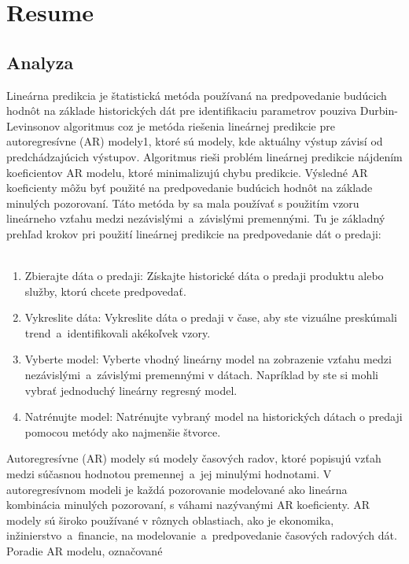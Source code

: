 \chapter{Resume} \label{resume}
    \section{Analyza} \label{sk:analytic}
    Lineárna predikcia je štatistická metóda používaná na predpovedanie budúcich hodnôt na základe historických dát pre
    identifikaciu parametrov pouziva Durbin-Levinsonov algoritmus coz je metóda riešenia lineárnej predikcie pre
    autoregresívne (AR) modely1, ktoré sú modely, kde aktuálny výstup závisí od predchádzajúcich výstupov. Algoritmus
    rieši problém lineárnej predikcie nájdením koeficientov AR modelu, ktoré minimalizujú chybu predikcie. Výsledné AR
    koeficienty môžu byť použité na predpovedanie budúcich hodnôt na základe minulých pozorovaní. Táto metóda by sa mala
    používať s použitím vzoru lineárneho vzťahu medzi nezávislými~a~závislými premennými. Tu je základný prehľad krokov
    pri použití lineárnej predikcie na predpovedanie dát o predaji:\\
    \\
    \begin{enumerate}
        \item Zbierajte dáta o predaji: Získajte historické dáta o predaji produktu alebo služby, ktorú chcete predpovedať.
        \item Vykreslite dáta: Vykreslite dáta o predaji v čase, aby ste vizuálne preskúmali trend~a~identifikovali
        akékoľvek vzory.
        \item Vyberte model: Vyberte vhodný lineárny model na zobrazenie vzťahu medzi nezávislými~a~závislými
        premennými v dátach. Napríklad by ste si mohli vybrať jednoduchý lineárny regresný model.
        \item Natrénujte model: Natrénujte vybraný model na historických dátach o predaji pomocou metódy ako najmenšie štvorce.
    \end{enumerate}
    Autoregresívne (AR) modely sú modely časových radov, ktoré popisujú vzťah medzi súčasnou hodnotou premennej~a~jej
    minulými hodnotami. V autoregresívnom modeli je každá pozorovanie modelované ako lineárna kombinácia minulých
    pozorovaní, s váhami nazývanými AR koeficienty. AR modely sú široko používané v rôznych oblastiach, ako je ekonomika,
    inžinierstvo~a~financie, na modelovanie~a~predpovedanie časových radových dát. Poradie AR modelu, označované
